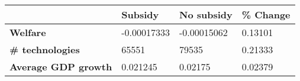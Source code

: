 \begin{tabular}{|l|l|l|l|}
\hline
&\textbf{Subsidy}&\textbf{No subsidy}&\textbf{\% Change}\\\hline
\textbf{Welfare}&-0.00017333&-0.00015062&0.13101\\\hline
\textbf{\# technologies}&65551&79535&0.21333\\\hline
\textbf{Average GDP growth}&0.021245&0.02175&0.02379\\\hline
\end{tabular}
